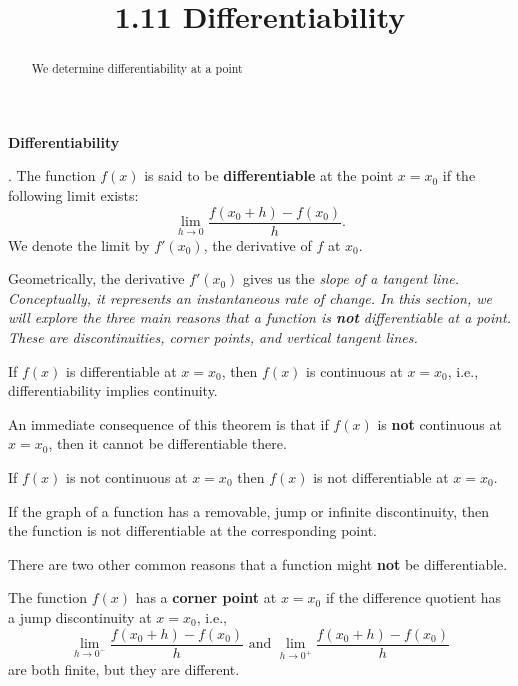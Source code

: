 \documentclass{ximera}
\title{1.11 Differentiability}
\begin{document}
\begin{abstract}
We determine differentiability at a point
\end{abstract}

\maketitle

\begin{center}
\textbf{Differentiability}
\end{center}


\begin{definition}[Differentiability].  The function $f(x)$ is said to be 
\textbf{differentiable} at the point $x= x_0$
if the following limit exists:
\[
\lim_{h\to 0} \frac{f(x_0+h) -f(x_0)}{h}.
\]
We denote the limit by $f'(x_0)$, the derivative of $f$ at $x_0$.

\end{definition}

Geometrically, the derivative $f'(x_0)$ gives us the \it{slope} of a tangent line.  
Conceptually, it represents an \it{instantaneous} rate of change.
In this section, we will explore the three main reasons that a function is \textbf{not} differentiable at a point. These are
discontinuities, corner points, and vertical tangent lines.

\begin{theorem}
If $f(x)$ is differentiable at $x = x_0$, then $f(x)$ is continuous at $x=x_0$, i.e.,
differentiability implies continuity.
\end{theorem}

An immediate consequence of this theorem is that if $f(x)$ is \textbf{not} continuous at $x = x_0$,
then it cannot be differentiable there.  

\begin{corollary}
If $f(x)$ is not continuous at $x = x_0$ then $f(x)$ is not differentiable at $x = x_0$.
\end{corollary}

If the graph of a function has a removable, jump or infinite discontinuity, 
then the function is not differentiable at the corresponding point.

There are two other common reasons that a function might \textbf{not} be differentiable.

\begin{definition} The function $f(x)$ has a \textbf{corner point} at $x = x_0$ if
the difference quotient has a jump discontinuity at $x = x_0$, i.e.,
\[
\lim_{h\to 0^-} \frac{f(x_0 +h)-f(x_0)}{h} \text{  and  }  \lim_{h\to 0^+} \frac{f(x_0 +h)-f(x_0)}{h}
\]
are both finite, but they are different.

\end{definition}
\end{document}
